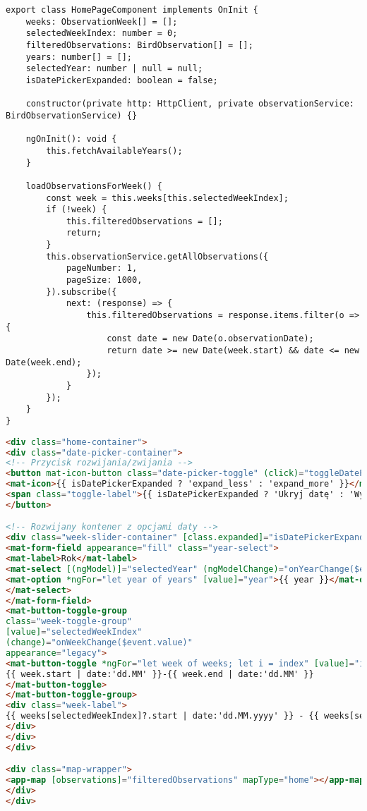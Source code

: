 \begin{lstlisting}[style=tsstyle, caption={Integracja ze stroną główną}]
export class HomePageComponent implements OnInit {
	weeks: ObservationWeek[] = [];
	selectedWeekIndex: number = 0;
	filteredObservations: BirdObservation[] = [];
	years: number[] = [];
	selectedYear: number | null = null;
	isDatePickerExpanded: boolean = false;
	
	constructor(private http: HttpClient, private observationService: BirdObservationService) {}
	
	ngOnInit(): void {
		this.fetchAvailableYears();
	}
	
	loadObservationsForWeek() {
		const week = this.weeks[this.selectedWeekIndex];
		if (!week) {
			this.filteredObservations = [];
			return;
		}
		this.observationService.getAllObservations({
			pageNumber: 1,
			pageSize: 1000,
		}).subscribe({
			next: (response) => {
				this.filteredObservations = response.items.filter(o => {
					const date = new Date(o.observationDate);
					return date >= new Date(week.start) && date <= new Date(week.end);
				});
			}
		});
	}
}
\end{lstlisting}

\begin{lstlisting}[language=HTML, caption={Szablon html strony głównej z wyborem daty}]
<div class="home-container">
<div class="date-picker-container">
<!-- Przycisk rozwijania/zwijania -->
<button mat-icon-button class="date-picker-toggle" (click)="toggleDatePicker()" [class.expanded]="isDatePickerExpanded">
<mat-icon>{{ isDatePickerExpanded ? 'expand_less' : 'expand_more' }}</mat-icon>
<span class="toggle-label">{{ isDatePickerExpanded ? 'Ukryj datę' : 'Wybierz datę' }}</span>
</button>

<!-- Rozwijany kontener z opcjami daty -->
<div class="week-slider-container" [class.expanded]="isDatePickerExpanded">
<mat-form-field appearance="fill" class="year-select">
<mat-label>Rok</mat-label>
<mat-select [(ngModel)]="selectedYear" (ngModelChange)="onYearChange($event)">
<mat-option *ngFor="let year of years" [value]="year">{{ year }}</mat-option>
</mat-select>
</mat-form-field>
<mat-button-toggle-group
class="week-toggle-group"
[value]="selectedWeekIndex"
(change)="onWeekChange($event.value)"
appearance="legacy">
<mat-button-toggle *ngFor="let week of weeks; let i = index" [value]="i">
{{ week.start | date:'dd.MM' }}-{{ week.end | date:'dd.MM' }}
</mat-button-toggle>
</mat-button-toggle-group>
<div class="week-label">
{{ weeks[selectedWeekIndex]?.start | date:'dd.MM.yyyy' }} - {{ weeks[selectedWeekIndex]?.end | date:'dd.MM.yyyy' }}
</div>
</div>
</div>

<div class="map-wrapper">
<app-map [observations]="filteredObservations" mapType="home"></app-map>
</div>
</div>
\end{lstlisting}

